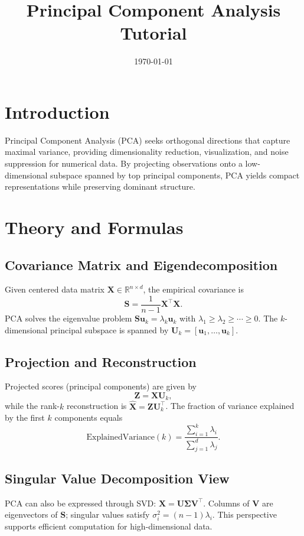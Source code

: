 ﻿\documentclass[12pt]{article}
\title{Principal Component Analysis Tutorial}
\author{}
\date{\today}
\begin{document}
\maketitle

\section{Introduction}
Principal Component Analysis (PCA) seeks orthogonal directions that capture maximal variance, providing dimensionality reduction, visualization, and noise suppression for numerical data. By projecting observations onto a low-dimensional subspace spanned by top principal components, PCA yields compact representations while preserving dominant structure.

\section{Theory and Formulas}
\subsection{Covariance Matrix and Eigendecomposition}
Given centered data matrix \(\mathbf{X} \in \mathbb{R}^{n \times d}\), the empirical covariance is
\begin{equation}
\mathbf{S} = \frac{1}{n-1} \mathbf{X}^\top \mathbf{X}.
\end{equation}
PCA solves the eigenvalue problem \(\mathbf{S}\mathbf{u}_k = \lambda_k \mathbf{u}_k\) with \(\lambda_1 \ge \lambda_2 \ge \cdots \ge 0\). The \(k\)-dimensional principal subspace is spanned by \(\mathbf{U}_k = [\mathbf{u}_1, \dots, \mathbf{u}_k]\).

\subsection{Projection and Reconstruction}
Projected scores (principal components) are given by
\begin{equation}
\mathbf{Z} = \mathbf{X} \mathbf{U}_k,
\end{equation}
while the rank-\(k\) reconstruction is \(\hat{\mathbf{X}} = \mathbf{Z}\mathbf{U}_k^\top\). The fraction of variance explained by the first \(k\) components equals
\begin{equation}
\text{ExplainedVariance}(k) = \frac{\sum_{i=1}^k \lambda_i}{\sum_{j=1}^d \lambda_j}.
\end{equation}

\subsection{Singular Value Decomposition View}
PCA can also be expressed through SVD: \(\mathbf{X} = \mathbf{U}\mathbf{\Sigma}\mathbf{V}^\top\). Columns of \(\mathbf{V}\) are eigenvectors of \(\mathbf{S}\); singular values satisfy \(\sigma_i^2 = (n-1)\lambda_i\). This perspective supports efficient computation for high-dimensional data.
\end{document}

